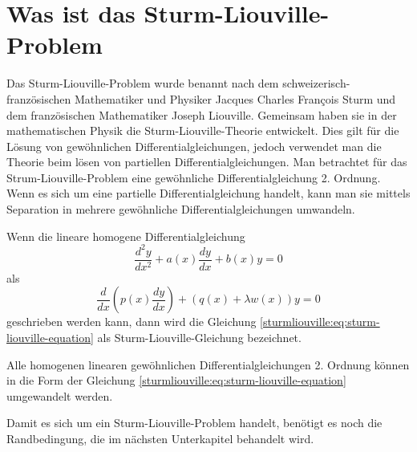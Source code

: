 %
%
%

%

\section{Was ist das Sturm-Liouville-Problem\label{sturmliouville:section:teil0}}
Das Sturm-Liouville-Problem wurde benannt nach dem schweizerisch-französischen
Mathematiker und Physiker Jacques Charles Fran\c{c}ois Sturm und dem
französischen Mathematiker Joseph Liouville.
Gemeinsam haben sie in der mathematischen Physik die Sturm-Liouville-Theorie
entwickelt.
Dies gilt für die Lösung von gewöhnlichen Differentialgleichungen,
jedoch verwendet man die Theorie beim lösen von partiellen
Differentialgleichungen.
Man betrachtet für das Strum-Liouville-Problem eine gewöhnliche
Differentialgleichung 2. Ordnung.
Wenn es sich um eine partielle
Differentialgleichung handelt, kann man sie mittels Separation in mehrere gewöhnliche
Differentialgleichungen umwandeln. 

\begin{definition}
Wenn die lineare homogene Differentialgleichung
\[
	\frac{d^2y}{dx^2} + a(x)\frac{dy}{dx} + b(x)y = 0
\]
als
\begin{equation}
	\label{sturmliouville:eq:sturm-liouville-equation}
	\frac{d}{dx} (p(x) \frac{dy}{dx}) + (q(x) +
	\lambda w(x)) y
	=
	0 
\end{equation}
geschrieben werden kann, dann wird die Gleichung \eqref{sturmliouville:eq:sturm-liouville-equation} als Sturm-Liouville-Gleichung
bezeichnet.
\end{definition}
Alle homogenen linearen gewöhnlichen Differentialgleichungen 2. Ordnung können
in die Form der Gleichung \eqref{sturmliouville:eq:sturm-liouville-equation} 
umgewandelt werden.

Damit es sich um ein Sturm-Liouville-Problem handelt, benötigt es noch die
Randbedingung, die im nächsten Unterkapitel behandelt wird.

